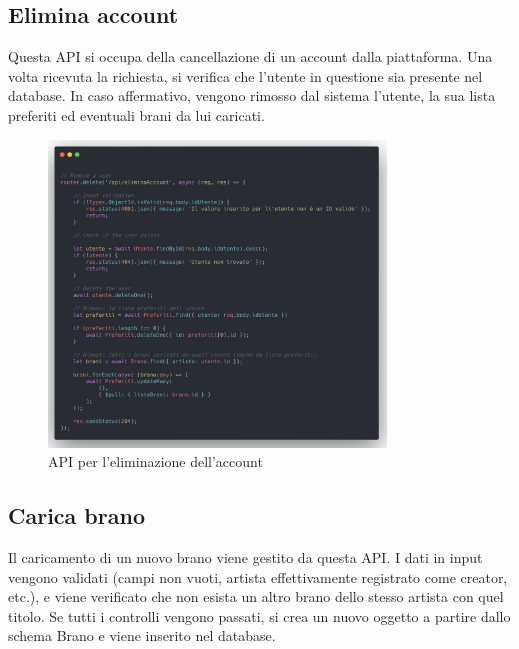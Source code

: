 \documentclass[a4paper,12pt]{article}
\begin{document}
\subsection{Elimina account}

Questa API si occupa della cancellazione di un account dalla piattaforma. Una volta ricevuta la richiesta, si verifica che l'utente in questione sia presente nel database. In caso affermativo, vengono rimosso dal sistema l'utente, la sua lista preferiti ed eventuali brani da lui caricati.

\begin{figure}[htp]
    \centering
    \includegraphics[width=0.8\textwidth]{source-code/api-elimina-account.png}
    \caption{API per l'eliminazione dell'account}
\end{figure}

\subsection{Carica brano}

Il caricamento di un nuovo brano viene gestito da questa API. I dati in input vengono validati (campi non vuoti, artista effettivamente registrato come creator, etc.), e viene verificato che non esista un altro brano dello stesso artista con quel titolo. Se tutti i controlli vengono passati, si crea un nuovo oggetto a partire dallo schema Brano e viene inserito nel database.
\end{document}
